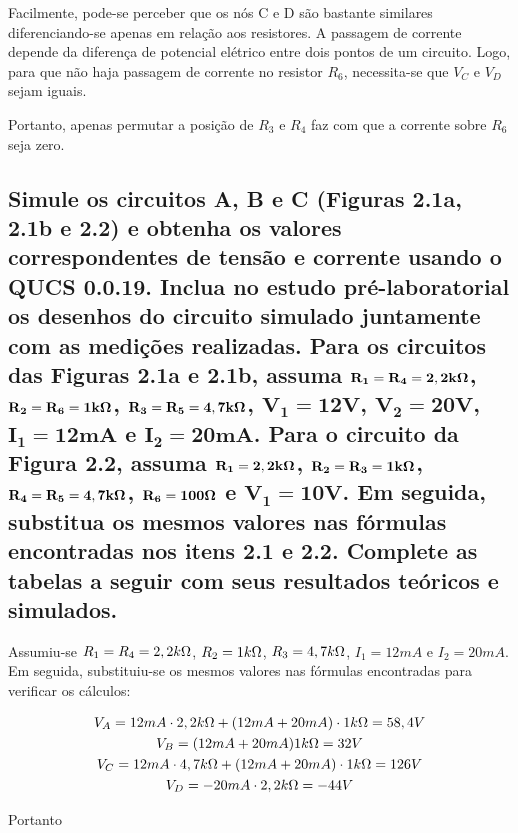 Facilmente, pode-se perceber que os nós C e D são bastante similares diferenciando-se apenas em relação aos resistores. A passagem de corrente depende da diferença de potencial elétrico entre dois pontos de um circuito. Logo, para que não haja passagem de corrente no resistor $R_6$, necessita-se que $V_C$ e $V_D$ sejam iguais. 

Portanto, apenas permutar a posição de $R_3$ e $R_4$ faz com que a corrente sobre $R_6$ seja zero.

\subsection{Simule os circuitos A, B e C (Figuras 2.1a, 2.1b e 2.2) e obtenha os valores correspondentes de tensão e corrente usando o
QUCS 0.0.19. Inclua no estudo pré-laboratorial os desenhos do circuito simulado juntamente com as medições realizadas. Para
os circuitos das Figuras 2.1a e 2.1b, assuma $\mathbf{R_1 = R_4 = 2,2k\ohm}$, $\mathbf{R_2 = R_6 = 1k\ohm}$, $\mathbf{R_3 = R_5 = 4,7k\ohm}$, $\mathbf{V_1 = 12V}$, $\mathbf{V_2 = 20V}$,
$\mathbf{I_1 = 12mA}$ e $\mathbf{I_2 = 20mA}$. Para o circuito da Figura 2.2, assuma $\mathbf{R_1 = 2,2k\ohm}$, $\mathbf{R_2 = R_3 = 1k\ohm}$, $\mathbf{R_4 = R_5 = 4,7k\ohm}$, $\mathbf{R_6 =
100\ohm}$ e $\mathbf{V_1 = 10V}$. Em seguida, substitua os mesmos valores nas fórmulas encontradas nos itens 2.1 e 2.2. Complete as
tabelas a seguir com seus resultados teóricos e simulados.}

Assumiu-se $R_1 = R_4 = 2,2k\ohm$, $R_2 = 1k\ohm$, $R_3 = 4,7k\ohm$, $I_1 = 12mA$ e $I_2 = 20mA$. Em seguida, substituiu-se os mesmos valores nas fórmulas encontradas para verificar os
cálculos:

\begin{gather*}
    V_A = 12mA\cdot 2,2k\ohm + (12mA + 20 mA)\cdot 1k\ohm = 58,4V\\
    V_B = (12mA + 20mA)1k\ohm = 32V\\
    V_C = 12mA\cdot 4,7k\ohm + (12mA + 20mA)\cdot 1k\ohm = 126V\\
    V_D = -20mA \cdot 2,2 k\ohm = -44V
\end{gather*}

Portanto